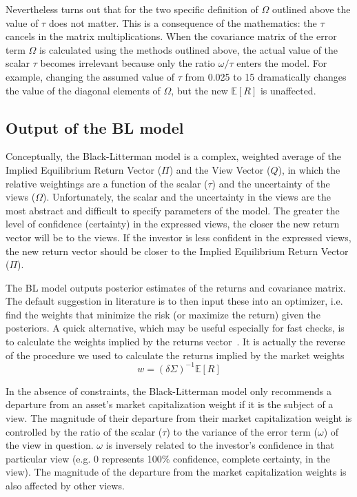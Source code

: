 Nevertheless turns out that for the two specific definition of $\Omega$ outlined above the value of $\tau$ does not matter. This is a consequence of the mathematics: the $\tau$ cancels in the matrix multiplications.
When the covariance matrix of the error term $\Omega$ is calculated using the methods outlined above, the actual value of the scalar $\tau$ becomes irrelevant because only the ratio $\omega/\tau$ enters the model. For example, changing the assumed value of $\tau$ from 0.025 to 15 dramatically changes the value of the diagonal elements of $\Omega$, but the new $\mathbb{E}[R]$ is unaffected.

\subsection{Output of the BL model}
Conceptually, the Black-Litterman model is a complex, weighted average of the Implied Equilibrium Return Vector ($\Pi$) and the View Vector ($Q$), in which the relative weightings are a function of the scalar ($\tau$) and the uncertainty of the views ($\Omega$).
Unfortunately, the scalar and the uncertainty in the views are the most abstract and difficult to specify parameters of the model. The greater the level of confidence (certainty) in the expressed views, the closer the new return vector will be to the views.
If the investor is less confident in the expressed views, the new return vector should be closer to the Implied Equilibrium Return Vector ($\Pi$).

The BL model outputs posterior estimates of the returns and covariance matrix. The default suggestion in literature is to then input these into an optimizer, i.e. find the weights that minimize the risk (or maximize the return) given the posteriors. A quick alternative, which may be useful especially for fast checks, is to calculate the weights implied by the returns vector~\cite{bib:walters}. 
It is actually the reverse of the procedure we used to calculate the returns implied by the market weights
\begin{equation}
w = (\delta\Sigma)^{-1}\mathbb{E}[R]
\end{equation}

In the absence of constraints, the Black-Litterman model only recommends a departure from an asset’s market capitalization weight if it is the subject of a view. The magnitude of their departure from their market capitalization weight is controlled by the ratio of the scalar ($\tau$) to the variance of the error term ($\omega$) of the view in question. $\omega$ is inversely related to the investor’s confidence in that particular view (e.g. 0 represents 100\% confidence, complete certainty, in the view). The magnitude of the departure from the market capitalization weights is also affected by other views. %

